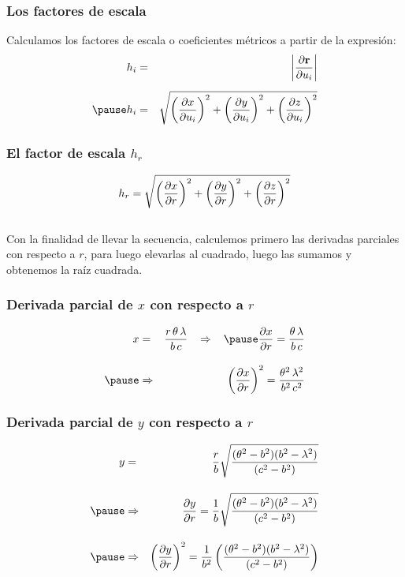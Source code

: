 \begin{frame}
\frametitle{Los factores de escala}
Calculamos los factores de escala o coeficientes métricos a partir de la expresión:
\begin{eqnarray*}
h_{i} &=& \abs{\pdv{\vb{r}}{u_{i}}} \\[0.5em]
\pause
h_{i} &=& \sqrt{ \left( \pdv{x}{u_{i}} \right)^{2} + \left( \pdv{y}{u_{i}} \right)^{2} + \left( \pdv{z}{u_{i}} \right)^{2}}
\end{eqnarray*}
\end{frame}
\begin{frame}
\frametitle{El factor de escala  $h_{r}$}
\begin{align*}
h_{r} = \sqrt{\left( \pdv{x}{r} \right)^{2} + \left( \pdv{y}{r} \right)^{2} + \left( \pdv{z}{r} \right)^{2}}
\end{align*}
\\
\bigskip
\pause
Con la finalidad de llevar la secuencia, calculemos primero las derivadas parciales con respecto a $r$, para luego elevarlas al cuadrado, luego las sumamos y obtenemos la raíz cuadrada.
\end{frame}
\begin{frame}
\frametitle{Derivada parcial de $x$ con respecto a $r$}
\begin{eqnarray*}
x &=& \dfrac{r \, \theta \, \lambda}{b \, c} \hspace{0.3cm} \Rightarrow \hspace{0.3cm} \pause \displaystyle \pdv{x}{r} = \dfrac{\theta \, \lambda}{b \, c} \\[1em] \pause
&\Rightarrow& \displaystyle \left( \pdv{x}{r} \right)^{2} = \dfrac{\theta^{2} \, \lambda^{2}}{b^{2} \, c^{2}}
\end{eqnarray*}
\end{frame}
\begin{frame}
\frametitle{Derivada parcial de $y$ con respecto a $r$}
\begin{eqnarray*}
y &=& \dfrac{r}{b} \sqrt{\dfrac{(\theta^{2} - b^{2})(b^{2} - \lambda^{2})}{(c^{2} - b^{2})}} \\[1em] \pause
&\Rightarrow& \hspace{0.3cm} \displaystyle \pdv{y}{r} = \dfrac{1}{b} \sqrt{\dfrac{(\theta^{2} - b^{2})(b^{2} - \lambda^{2})}{(c^{2} - b^{2})}} \\[1em] \pause
&\Rightarrow& \left( \pdv{y}{r} \right)^{2} = \dfrac{1}{b^{2}} \left( \dfrac{(\theta^{2} - b^{2})(b^{2} - \lambda^{2})}{(c^{2} - b^{2})}\right)
\end{eqnarray*}
\end{frame}
